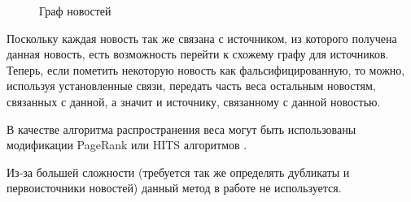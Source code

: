 \begin{figure}[h]
    \centering
    \caption{Граф новостей}
    \label{fig:news-graph}
\end{figure}

Поскольку каждая новость так же связана с источником, из которого получена данная новость, есть возможность перейти к схожему графу для источников. Теперь, если пометить некоторую новость как фальсифицированную, то можно, используя установленные связи, передать часть веса остальным новостям, связанных с данной, а значит и источнику, связанному с данной новостью.

В качестве алгоритма распространения веса могут быть использованы модификации PageRank или HITS алгоритмов \cite{segaran07}.

Из-за большей сложности (требуется так же определять дубликаты и первоисточники новостей) данный метод в работе не используется.
